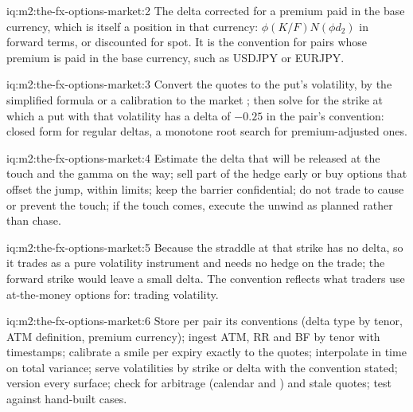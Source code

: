\begin{solution}{iq:m2:the-fx-options-market:2}
The delta corrected for a premium paid in the base currency, which is itself a
position in that currency: $\phi(K/F)N(\phi d_2)$ in forward terms, or discounted
for spot. It is the convention for pairs whose premium is paid in the base
currency, such as USDJPY or EURJPY.
\end{solution}

\begin{solution}{iq:m2:the-fx-options-market:3}
Convert the quotes to the put's volatility, by the simplified formula or a
calibration to the market ; then solve for the strike at which a put with
that volatility has a delta of $-0.25$ in the pair's convention: closed form for
regular deltas, a monotone root search for premium-adjusted ones.
\end{solution}

\begin{solution}{iq:m2:the-fx-options-market:4}
Estimate the delta that will be released at the touch and the gamma on the way;
sell part of the hedge early or buy options that offset the jump, within limits;
keep the barrier confidential; do not trade to cause or prevent the touch; if
the touch comes, execute the unwind as planned rather than chase.
\end{solution}

\begin{solution}{iq:m2:the-fx-options-market:5}
Because the straddle at that strike has no delta, so it trades as a pure
volatility instrument and needs no hedge on the trade; the forward strike would
leave a small delta. The convention reflects what traders use at-the-money
options for: trading volatility.
\end{solution}

\begin{solution}{iq:m2:the-fx-options-market:6}
Store per pair its conventions (delta type by tenor, ATM definition, premium
currency); ingest ATM, RR and BF by tenor with timestamps; calibrate a smile per
expiry exactly to the quotes; interpolate in time on total variance; serve
volatilities by strike or delta with the convention stated; version every surface;
check for arbitrage (calendar and ) and stale quotes; test against
hand-built cases.
\end{solution}
